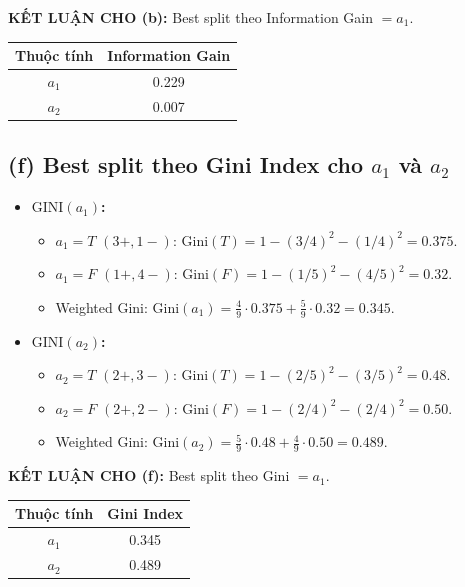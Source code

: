 \textbf{KẾT LUẬN CHO (b):} Best split theo Information Gain $= a_1$.
\begin{table}[H]
    \centering
    \begin{tabular}{|c|c|}
        \hline
        \textbf{Thuộc tính} & \textbf{Information Gain} \\
        \hline
        $a_1$ & 0.229 \\ \hline
        $a_2$ & 0.007 \\ \hline
    \end{tabular}
\end{table}

\subsection*{(f) Best split theo Gini Index cho $a_1$ và $a_2$}
\begin{itemize}
    \item \textbf{$\text{GINI}(a_1)$:}
    \begin{itemize}
        \item $a_1 = T$ $(3+, 1-)$: $\text{Gini}(T) = 1 - (3/4)^2 - (1/4)^2 = 0.375$.
        \item $a_1 = F$ $(1+, 4-)$: $\text{Gini}(F) = 1 - (1/5)^2 - (4/5)^2 = 0.32$.
        \item Weighted Gini: $\text{Gini}(a_1) = \frac{4}{9}\cdot 0.375 + \frac{5}{9}\cdot 0.32 = 0.345$.
    \end{itemize}
    \item \textbf{$\text{GINI}(a_2)$:}
    \begin{itemize}
        \item $a_2 = T$ $(2+, 3-)$: $\text{Gini}(T) = 1 - (2/5)^2 - (3/5)^2 = 0.48$.
        \item $a_2 = F$ $(2+, 2-)$: $\text{Gini}(F) = 1 - (2/4)^2 - (2/4)^2 = 0.50$.
        \item Weighted Gini: $\text{Gini}(a_2) = \frac{5}{9}\cdot 0.48 + \frac{4}{9}\cdot 0.50 = 0.489$.
    \end{itemize}
\end{itemize}

\textbf{KẾT LUẬN CHO (f):} Best split theo Gini $= a_1$.
\begin{table}[H]
    \centering
    \begin{tabular}{|c|c|}
        \hline
        \textbf{Thuộc tính} & \textbf{Gini Index} \\
        \hline
        $a_1$ & 0.345 \\ \hline
        $a_2$ & 0.489 \\ \hline
    \end{tabular}
\end{table}